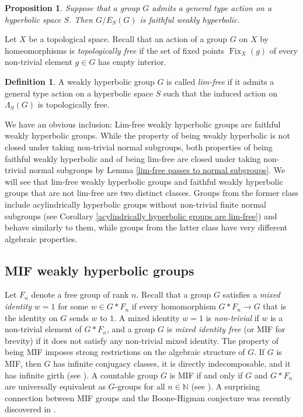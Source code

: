 \documentclass[11pt,letterpaper]{article}
\newcommand{\NN}{\mathbb{N}}
\DeclareMathOperator{\Fix}{Fix}
\newtheorem{propA}[thmA]{Proposition}
\theoremstyle{definition}
\newtheorem{defn}[thm]{Definition}
\theoremstyle{remark}
\begin{document}
\begin{propA}\label{faithful weakly hyperbolic quotient}
Suppose that a group $G$ admits a general type action on a hyperbolic space $S$. Then $G/E_S(G)$ is faithful weakly hyperbolic.
\end{propA}

Let $X$ be a topological space. Recall that an action of a group $G$ on $X$ by homeomorphisms is {\it topologically free} if the set of fixed points $\Fix_X(g)$ of every non-trivial element $g \in G$ has empty interior.

\begin{defn}
A weakly hyperbolic group $G$ is called {\it lim-free} if it admits a general type action on a hyperbolic space $S$ such that the induced action on $\Lambda_S(G)$ is topologically free.
\end{defn}


We have an obvious inclusion: Lim-free weakly hyperbolic groups are faithful weakly hyperbolic groups. While the property of being weakly hyperbolic is not closed under taking non-trivial normal subgroups, both properties of being faithful weakly hyperbolic and of being lim-free are closed under taking non-trivial normal subgroups by Lemma \ref{lim-free passes to normal subgroups}. We will see that lim-free weakly hyperbolic groups and faithful weakly hyperbolic groups that are not lim-free are two distinct classes. Groups from the former class include acylindrically hyperbolic groups without non-trivial finite normal subgroups (see Corollary \ref{acylindrically hyperbolic groups are lim-free}) and behave similarly to them, while groups from the latter class have very different algebraic properties. 

\subsection{MIF weakly hyperbolic groups}

Let $F_n$ denote a free group of rank $n$. Recall that a group $G$ satisfies a {\it mixed identity} $w=1$ for some $w \in G * F_n$ if every homomorphism $G * F_n \rightarrow G$ that is the identity on $G$ sends $w$ to $1$. A mixed identity $w=1$ is {\it non-trivial} if $w$ is a non-trivial element of $G * F_n$, and a group $G$ is {\it mixed identity free} (or MIF for brevity) if it does not satisfy any non-trivial mixed identity. 
The property of being MIF imposes strong restrictions on the algebraic structure of $G$. If $G$ is MIF, then $G$ has infinite conjugacy classes, it is directly indecomposable, and it has infinite girth (see \cite[Prop. 5.4]{OH}). A countable group $G$ is MIF if and only if $G$ and $G * F_n$ are universally equivalent as $G$-groups for all $n \in \NN$ (see \cite[Prop. 5.3]{OH}). A surprising connection between MIF groups and the Boone-Higman conjecture was recently discovered in \cite{BFFHZ}.
\end{document}
